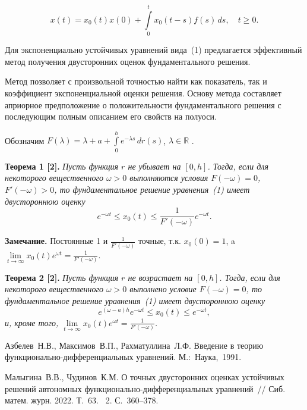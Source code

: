 $$
 x(t)=x_0(t)x(0) +\int\limits_{0}^{t}x_0(t-s)f(s)\,ds,\quad t\ge0.
$$

Для экспоненциально устойчивых уравнений вида~(1)  предлагается эффективный метод получения двусторонних оценок фундаментального решения.

Метод позволяет с произвольной точностью найти как показатель, так и коэффициент экспоненциальной оценки решения.
Основу метода составляет априорное предположение о положительности фундаментального решения с последующим полным  описанием его свойств на полуоси.



Обозначим $F(\lambda)=\lambda+a+\int\limits_{0}^{h}e^{-\lambda s}\,dr(s)$, $\lambda\in\mathbb{R}$ .

{\bf Теорема 1 [2].}
{\it Пусть функция $r$ не убывает на $[0,h]$.
Тогда, если для некоторого вещественного $\omega>0$ выполняются условия $F(-\omega)=0$, $F'(-\omega)>0$, то фундаментальное решение уравнения~{\rm (1)} имеет двустороннюю оценку
$$e^{-\omega t}\le x_0(t)\le \frac{1}{F'(-\omega)}e^{-\omega t}.$$}

{\bf Замечание.} Постоянные 1 и $\frac{1}{F'(-\omega)}$ точные, т.к. $x_0(0)=1$, a $\lim\limits_{t \to \infty}x_0(t)e^{\omega t}=\frac{1}{F'(-\omega)}$.

{\bf Теорема 2 [2].}
{\it Пусть функция $r$ не возрастает на $[0,h]$.
Тогда, если для некоторого вещественного $\omega>0$ выполнено условие $F(-\omega)=0$, то фундаментальное решение уравнения~{\rm (1)} имеет двустороннюю оценку
$$e^{(\omega-a)h}e^{-\omega t}\le x_0(t)\le e^{-\omega t},$$
и, кроме того,  $\lim\limits_{t \to \infty}x_0(t)e^{\omega t}=\frac{1}{F'(-\omega)}$.}




\begin{thebibliography}{9} %
 Азбелев~Н.В., Максимов~В.П., Рахматуллина~Л.Ф. Введение в теорию функ\-ци\-о\-наль\-но-дифференциальных уравнений. М.:~Наука,~1991.

 Малыгина~В.В., Чудинов~К.М. О точных двусторонних оценках устойчивых решений автономных функционально-дифференциальных уравнений~// Сиб. матем. журн. 2022. Т.~63. \textnumero~2. С.~360--378.

\end{thebibliography}




%